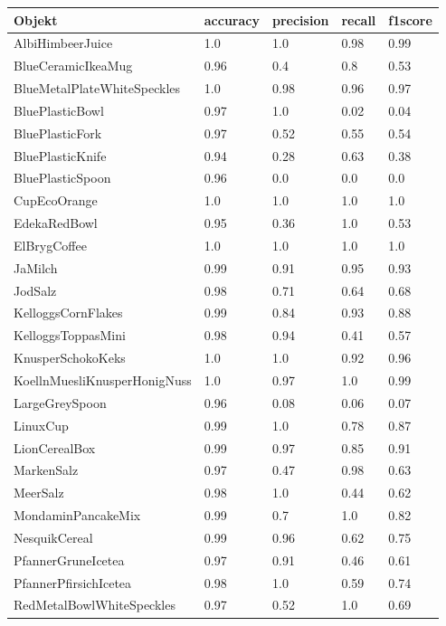 \begin{table}
\begin{tabularx}{\textwidth}{Xllll}
\textbf{Objekt}	& \textbf{\gls{accuracy}} & \textbf{\gls{precision}}	& \textbf{\gls{recall}}	& \textbf{\gls{f1score}} \\ \hline
AlbiHimbeerJuice & 1.0 & 1.0 & 0.98 & 0.99 \\  
BlueCeramicIkeaMug & 0.96 & 0.4 & 0.8 & 0.53 \\  
BlueMetalPlateWhiteSpeckles & 1.0 & 0.98 & 0.96 & 0.97 \\  
BluePlasticBowl & 0.97 & 1.0 & 0.02 & 0.04 \\  
BluePlasticFork & 0.97 & 0.52 & 0.55 & 0.54 \\  
BluePlasticKnife & 0.94 & 0.28 & 0.63 & 0.38 \\  
BluePlasticSpoon & 0.96 & 0.0 & 0.0 & 0.0 \\  
CupEcoOrange & 1.0 & 1.0 & 1.0 & 1.0 \\  
EdekaRedBowl & 0.95 & 0.36 & 1.0 & 0.53 \\  
ElBrygCoffee & 1.0 & 1.0 & 1.0 & 1.0 \\  
JaMilch & 0.99 & 0.91 & 0.95 & 0.93 \\  
JodSalz & 0.98 & 0.71 & 0.64 & 0.68 \\  
KelloggsCornFlakes & 0.99 & 0.84 & 0.93 & 0.88 \\  
KelloggsToppasMini & 0.98 & 0.94 & 0.41 & 0.57 \\  
KnusperSchokoKeks & 1.0 & 1.0 & 0.92 & 0.96 \\  
KoellnMuesliKnusperHonigNuss & 1.0 & 0.97 & 1.0 & 0.99 \\  
LargeGreySpoon & 0.96 & 0.08 & 0.06 & 0.07 \\  
LinuxCup & 0.99 & 1.0 & 0.78 & 0.87 \\  
LionCerealBox & 0.99 & 0.97 & 0.85 & 0.91 \\  
MarkenSalz & 0.97 & 0.47 & 0.98 & 0.63 \\  
MeerSalz & 0.98 & 1.0 & 0.44 & 0.62 \\  
MondaminPancakeMix & 0.99 & 0.7 & 1.0 & 0.82 \\  
NesquikCereal & 0.99 & 0.96 & 0.62 & 0.75 \\  
PfannerGruneIcetea & 0.97 & 0.91 & 0.46 & 0.61 \\  
PfannerPfirsichIcetea & 0.98 & 1.0 & 0.59 & 0.74 \\  
RedMetalBowlWhiteSpeckles & 0.97 & 0.52 & 1.0 & 0.69 \\  

\end{tabularx}
\end{table}
